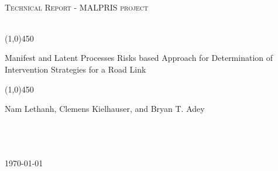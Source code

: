 \documentclass[a4paper, 12pt, twoside]{report}  %
\begin{document}
\frontmatter	  %

\begin{titlepage}

\text{}\\

\begin{center}


\textsc{\normalsize Technical Report - MALPRIS project}\\[0.5cm]

\text{}\\
\begin{center}
\line(1,0){450}
\end{center}
{ \huge Manifest and Latent Processes Risks based Approach for Determination of Intervention Strategies for a Road Link}
\begin{center}
\line(1,0){450}
\end{center}

\begin{minipage}{0.9\textwidth}
\begin{center}
Nam Lethanh, Clemens Kielhauser, and Bryan T. Adey
\end{center}
\end{minipage}

\vfill

\\
\\
\\[0.5cm]
{\normalsize \today}
\end{center}
\end{titlepage}


\end{document}
